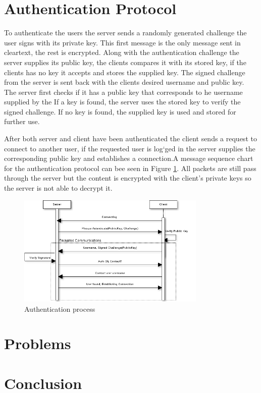 \documentclass[twocolumn,11pt]{IEEEtran}
\begin{document}
\section{Authentication Protocol}
\label{sec:auth}
To authenticate the users the server sends a randomly generated challenge the user signs with its private key. This first message is the only message sent in cleartext, the rest is encrypted. Along with the authentication challenge the server supplies its public key, the clients compares it with its stored key, if the clients has no key it accepts and stores the supplied key. The signed challenge from the server is sent back with the clients desired username and public key. The server first checks if it has a public key that corresponds to he username supplied by the  If a key is found, the server uses the stored key to verify the signed challenge. If no key is found, the supplied key is used and stored for further use.

After both server and client have been authenticated the client sends a request to connect to another user, if the requested user is log`ged in the server supplies the corresponding public key and establishes a connection.A message sequence chart for the authentication protocol can bee seen in Figure \ref{fig:auth}. All packets are still pass through the server but the content is encrypted with the client's private keys so the server is not able to decrypt it.

 

\begin{figure}
\label{fig:auth}
\centerline{
\includegraphics[width=90mm]{auth.png}}
\caption{Authentication process}
\end{figure}


\section{Problems}
\label{sec:problems}


\section {Conclusion}
\label{sec:conclusion}
\end{document}
